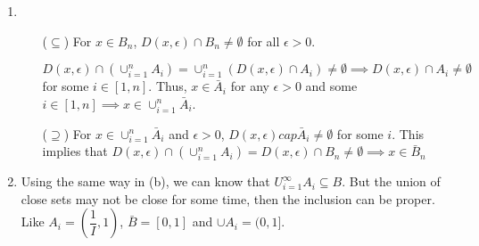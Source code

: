 \documentclass[12pt]{article}
\begin{document}
\begin{enumerate}
\begin{enumerate}
        \item \begin{enumerate}
            \item[($\subseteq$)] For $x \in B_n$, $D(x, \epsilon) \cap B_n \neq \emptyset$ for all $\epsilon > 0$.

            $D(x, \epsilon) \cap (\cup^{n}_{i=1} A_i) = \cup^{n}_{i=1} (D(x, \epsilon) \cap A_i) \neq \emptyset\implies D(x, \epsilon) \cap A_i\neq \emptyset$ for some $i \in [1, n]$.
            Thus, $x \in \bar{A}_i$ for any $\epsilon > 0$ and some $i \in [1, n] \implies x \in \cup_{i=1}^n \bar{A}_i$.
 
            \item[($\supseteq$)] For $x \in \cup_{i=1}^n \bar{A}_i$ and $\epsilon > 0$, $D(x, \epsilon) cap \bar{A}_i \neq \emptyset$ for some $i$.
            This implies that $D(x, \epsilon) \cap (\cup_{i=1}^n A_i) = D(x, \epsilon) \cap B_n \neq \emptyset\implies x \in \bar{B}_n$
        \end{enumerate}

        \item Using the same way in (b), we can know that $U_{i=1}^{\infty} A_i \subseteq B$.
        But the union of close sets may not be close for some time, then the inclusion can be proper. Like $A_i = (\dfrac{1}{I}, 1)$, $\bar{B} = [0, 1]$ and $\cup A_i = (0, 1]$.
    \end{enumerate}
\end{enumerate}
\end{document}
